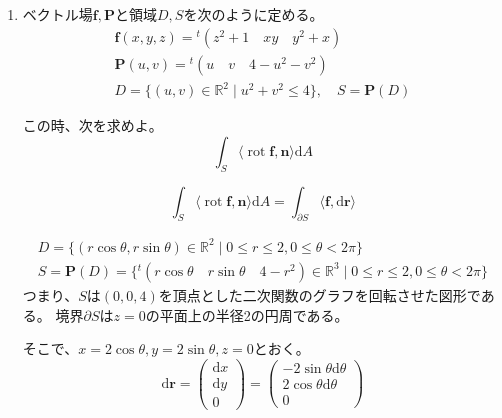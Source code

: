 \documentclass[12pt,b5paper]{ltjsarticle}
\newcommand{\Rot}{\mathop{\mathrm{rot}}\nolimits}
\begin{document}
\begin{enumerate}
\hrulefill

 \item
      ベクトル場$\bm{f},\bm{P}$と領域$D,S$を次のように定める。
      \begin{gather}
       \bm{f}(x,y,z) = {}^{t}(z^2+1 \quad xy \quad y^2+x)\\
       \bm{P}(u,v) = {}^{t}(u \quad v \quad 4-u^2-v^2)\\
       D = \{ (u,v)\in\mathbb{R}^2 \mid u^2+v^2\leq 4 \},\quad
       S = \bm{P}(D)
      \end{gather}

      この時、次を求めよ。
      \begin{equation}
       \int_S \langle \Rot\bm{f},\bm{n}\rangle \mathrm{d}A
      \end{equation}

\dotfill

      \begin{equation}
       \int_S \langle \Rot\bm{f},\bm{n}\rangle \mathrm{d}A
        =
        \int_{\partial S} \langle \bm{f},\mathrm{d}\bm{r}\rangle
      \end{equation}


      \begin{gather}
       D=\{ (r\cos\theta,r\sin\theta) \in\mathbb{R}^2 \mid 0\leq r\leq 2, 0\leq \theta < 2\pi \}\\
       S=\bm{P}(D) = \{ {}^{t}(r\cos\theta \quad r\sin\theta \quad 4-r^2 ) \in\mathbb{R}^3
         \mid  0\leq r\leq 2, 0\leq \theta < 2\pi \}
      \end{gather}
      つまり、$S$は$(0,0,4)$を頂点とした二次関数のグラフを回転させた図形である。
      境界$\partial S$は$z=0$の平面上の半径2の円周である。

      そこで、$x=2\cos\theta,y=2\sin\theta,z=0$とおく。
      \begin{equation}
       \mathrm{d}\bm{r}
        =
        \begin{pmatrix}
         \mathrm{d}x\\\mathrm{d}y\\0
        \end{pmatrix}
        =
        \begin{pmatrix}
         -2\sin\theta\mathrm{d}\theta\\2\cos\theta\mathrm{d}\theta\\0
        \end{pmatrix}
      \end{equation}



\end{enumerate}
\end{document}
